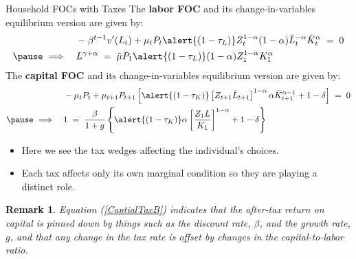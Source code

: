 \documentclass[10pt,c,aspectratio=1610,handout]{beamer}
\newtheorem{remark}{Remark}
\begin{document}
\begin{frame}{Household FOCs with Taxes}%
  The \textbf{labor FOC} and its change-in-variables equilibrium version are given by:%
  \begin{align}%
    & -\beta^{t-1} v^{\prime}(L_{t}) + \mu_{t} P_{t} \alert{(1-\tau_L)} Z_{t}^{1-\alpha} (1-\alpha) \bar{L}_{t}^{-\alpha} \bar{K}_{t}^{\alpha} \; = \; 0\notag\\%
    \pause%
    \implies \quad & L^{\gamma +\alpha} \; = \; \tilde{\mu} P_{1} \alert{(1-\tau_L)} (1-\alpha) Z_{1}^{1-\alpha} K_{1}^{\alpha} \label{LaborTaxB}%
  \end{align}%
  \pause%
  The \textbf{capital FOC} and its change-in-variables equilibrium version are given by:%
  \begin{align}%
    & -\mu_{t} P_{t} + \mu_{t+1} P_{t+1} \left[ \alert{(1-\tau_K)} \left[ Z_{t+1} \bar{L}_{t+1} \right]^{1-\alpha} \alpha \bar{K}_{t+1}^{\alpha-1} + 1 - \delta \right] \; = \; 0\notag\\%
    \pause%
    \implies \quad & 1 \; = \; \frac{\beta}{1+g} \left\{ \alert{(1-\tau_K)} \alpha \left[ \frac{Z_{1} L}{K_{1}}\right]^{1-\alpha} + 1 - \delta \right\} \label{CaptialTaxB}%
  \end{align}%
  \vspace*{-0.2in}%
  \begin{small}%
    \begin{itemize}%
      \item[$\blacktriangleright$] Here we see the tax wedges affecting the individual's choices.%
      \item[$\blacktriangleright$] Each tax affects only its own marginal condition so they are playing a distinct role.%
    \end{itemize}%
    \vspace*{0.15in}%
    \pause%
    \begin{remark}%
      Equation (\ref{CaptialTaxB}) indicates that the after-tax return on capital is pinned down by things such as the discount rate, $\beta$, and the growth rate, $g$, and that any change in the tax rate is offset by changes in the capital-to-labor ratio.%
    \end{remark}%
  \end{small}%
\end{frame}%
\end{document}
